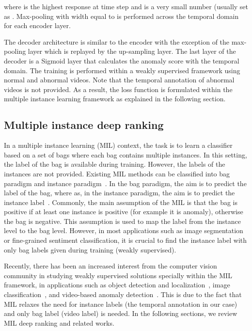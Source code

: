 \documentclass[journal]{IEEEtran}
\begin{document}
where  is the highest response at time step   and  is a very small number (usually set as . Max-pooling with width equal to  is performed across the temporal domain for each encoder layer.

The decoder architecture is similar to the encoder with the exception of the max-pooling layer which is replayed by the up-sampling layer. The last layer of the decoder is a Sigmoid layer that calculates the anomaly score  with the temporal domain. The training is performed within a weakly supervised framework using normal and abnormal videos. Note that the temporal annotation of abnormal videos is not provided. As a result, the loss function is formulated within the multiple instance learning framework as explained in the following section.


\subsection{Multiple instance deep ranking}


In a multiple instance learning (MIL) context, the task is to learn a classifier based on a set of bags where each bag contains multiple instances. In this setting, the label of the bag is available during training. However, the labels of the instances are not provided. Existing MIL methods can be classified into bag paradigm and instance paradigm~\cite{carbonneau2018multiple}. In the bag paradigm, the aim is to predict the label of the bag, where as, in the instance paradigm, the aim is to predict the instance label~\cite{peng2019address}. Commonly, the main assumption of the MIL is that the bag is positive if at least one instance is positive (for example it is anomaly), otherwise  the bag is negative. This assumption is used to map the label from the instance level to the bag level. However, in most applications such as image segmentation or fine-grained sentiment classification, it is crucial to find the instance label with only bag labels given during training (weakly supervised).

Recently, there has been an increased interest from the computer vision community in studying weakly supervised solutions specially within the MIL framework, in applications such as object detection and localization~\cite{bilen2015weakly,cinbis2016weakly}, image classification~\cite{cabral2014matrix}, and video-based anomaly detection~\cite{sultani2018real}. This is due to the fact that MIL relaxes the need for instance labels (the temporal annotation in our case) and only bag label (video label) is needed. In the following sections, we review MIL deep ranking and related works.
\end{document}
